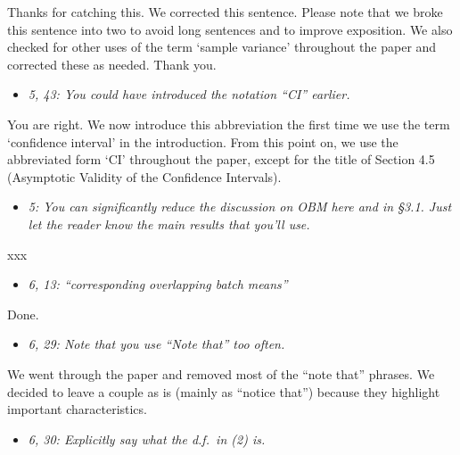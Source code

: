 \documentclass[11pt,notitlepage,onecolumn]{article}
\newcommand{\noi}{\noindent}
\begin{document}
\noi
Thanks for catching this. 
We corrected this sentence. 
Please note that we broke this sentence into two to avoid long sentences and to improve exposition. 
We also checked for other uses of the term `sample variance' throughout the paper and corrected these as needed.
Thank you.  
\medskip 


\begin{itemize}
\item[] \textit{5, 43: You could have introduced the notation ``CI'' earlier.}
\end{itemize}

\noi
You are right. 
We now introduce this abbreviation the first time we use the term `confidence interval' in the introduction. 
From this point on, we use the abbreviated form `CI' throughout the paper, except for the title of Section 4.5 (Asymptotic Validity of the Confidence Intervals). 
\medskip 



\begin{itemize}
\item[] \textit{5: You can significantly reduce the discussion on OBM here and in \S 3.1. 
Just let the reader know the main results that you'll use.}
\end{itemize}

\noi
xxx  
\medskip 



\begin{itemize}
\item[] \textit{6, 13: ``corresponding overlapping batch means''}
\end{itemize}

\noi
Done. 
\medskip 



\begin{itemize}
\item[] \textit{6, 29: Note that you use ``Note that'' too often.}
\end{itemize}

\noi
We went through the paper and removed most of the ``note that'' phrases. 
We decided to leave a couple as is (mainly as ``notice that'') because they highlight important characteristics.  
\medskip 



\begin{itemize}
\item[] \textit{6, 30: Explicitly say what the d.f.\ in (2) is.}
\end{itemize}
\end{document}
